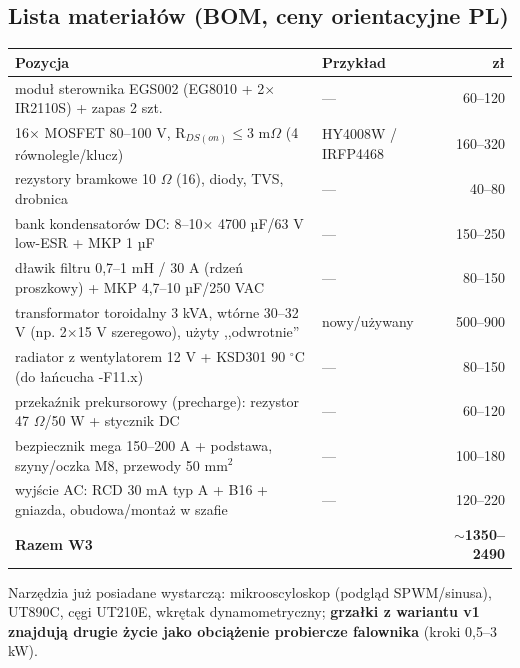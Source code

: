 \documentclass[11pt,a4paper]{article}
\newcommand{\ohm}{$\Omega$}
\begin{document}
\subsection{Lista materiałów (BOM, ceny orientacyjne PL)}
\begin{longtable}{@{}p{}p{}r@{}}
\toprule
\textbf{Pozycja} & \textbf{Przykład} & \textbf{zł}\\
\midrule
moduł sterownika EGS002 (EG8010 + 2$\times$IR2110S) + zapas 2 szt. & --- & 60--120\\
16$\times$ MOSFET 80--100 V, R$_{DS(on)}\le$3 m\ohm{} (4 równolegle/klucz) & HY4008W / IRFP4468 & 160--320\\
rezystory bramkowe 10 \ohm{} (16), diody, TVS, drobnica & --- & 40--80\\
bank kondensatorów DC: 8--10$\times$ 4700 µF/63 V low-ESR + MKP 1 µF & --- & 150--250\\
dławik filtru 0,7--1 mH / 30 A (rdzeń proszkowy) + MKP 4,7--10 µF/250 VAC & --- & 80--150\\
transformator toroidalny 3 kVA, wtórne 30--32 V (np. 2$\times$15 V szeregowo), użyty ,,odwrotnie'' & nowy/używany & 500--900\\
radiator z wentylatorem 12 V + KSD301 90 $^\circ$C (do łańcucha -F11.x) & --- & 80--150\\
przekaźnik prekursorowy (precharge): rezystor 47 \ohm{}/50 W + stycznik DC & --- & 60--120\\
bezpiecznik mega 150--200 A + podstawa, szyny/oczka M8, przewody 50 mm$^2$ & --- & 100--180\\
wyjście AC: RCD 30 mA typ A + B16 + gniazda, obudowa/montaż w szafie & --- & 120--220\\
\midrule
\textbf{Razem W3} & & \textbf{$\sim$1350--2490}\\
\bottomrule
\end{longtable}
Narzędzia już posiadane wystarczą: mikrooscyloskop (podgląd SPWM/sinusa), UT890C, cęgi UT210E,
wkrętak dynamometryczny; \textbf{grzałki z wariantu v1 znajdują drugie życie jako obciążenie
probiercze falownika} (kroki 0,5--3 kW).
\end{document}
